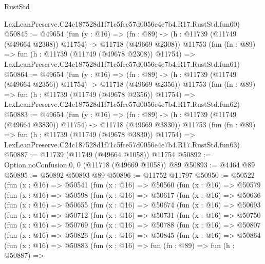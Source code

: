 \begin{lexlean}{RustStd}
\begin{coremodule}
    LexLeanPreserve.C24c187528d1f71c5fce57d0056e4e7b4.R17.RustStd.fun60)
@50845 := @49654
    (fun (y : @16) =>
    (fn : @89) -> (h : @11739 (@11749 (@49664 @2308)) @11754) -> @11718 (@49669 @2308))
    @11753
    (fun (fn : @89) =>
    fun (h : @11739 (@11749 (@49678 @2308)) @11754) =>
    LexLeanPreserve.C24c187528d1f71c5fce57d0056e4e7b4.R17.RustStd.fun61)
@50864 := @49654
    (fun (y : @16) =>
    (fn : @89) -> (h : @11739 (@11749 (@49664 @2356)) @11754) -> @11718 (@49669 @2356))
    @11753
    (fun (fn : @89) =>
    fun (h : @11739 (@11749 (@49678 @2356)) @11754) =>
    LexLeanPreserve.C24c187528d1f71c5fce57d0056e4e7b4.R17.RustStd.fun62)
@50883 := @49654
    (fun (y : @16) =>
    (fn : @89) -> (h : @11739 (@11749 (@49664 @3830)) @11754) -> @11718 (@49669 @3830))
    @11753
    (fun (fn : @89) =>
    fun (h : @11739 (@11749 (@49678 @3830)) @11754) =>
    LexLeanPreserve.C24c187528d1f71c5fce57d0056e4e7b4.R17.RustStd.fun63)
@50887 := @11739 (@11749 (@49664 @1058)) @11754
@50892 := Option.noConfusion.{0, 0} (@11718 (@49669 @1058)) @89
@50893 := @4464 @89
@50895 := @50892 @50893 @89
@50896 := @11752 @11797
@50950 := @50522
    (fun (x : @16) =>
    @50541
      (fun (x : @16) =>
      @50560
        (fun (x : @16) =>
        @50579
          (fun (x : @16) =>
          @50598
            (fun (x : @16) =>
            @50617
              (fun (x : @16) =>
              @50636
                (fun (x : @16) =>
                @50655
                  (fun (x : @16) =>
                  @50674
                    (fun (x : @16) =>
                    @50693
                      (fun (x : @16) =>
                      @50712
                        (fun (x : @16) =>
                        @50731
                          (fun (x : @16) =>
                          @50750
                            (fun (x : @16) =>
                            @50769
                              (fun (x : @16) =>
                              @50788
                                (fun (x : @16) =>
                                @50807
                                  (fun (x : @16) =>
                                  @50826
                                    (fun (x : @16) =>
                                    @50845
                                      (fun (x : @16) =>
                                      @50864
                                        (fun (x : @16) =>
                                        @50883
                                          (fun (x : @16) =>
                                          fun (fn : @89) =>
                                          fun (h : @50887) =>

\end{coremodule}
\end{lexlean}
